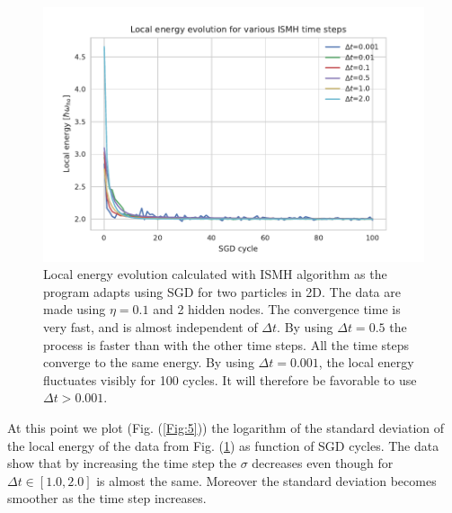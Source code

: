 \begin{figure}[ht]
\centering
\includegraphics[scale=1.0]{plot4.pdf}
\caption{Local energy evolution calculated with ISMH algorithm as the program adapts using SGD for two particles in 2D. The data are made using $\eta = 0.1$ and 2 hidden nodes. The convergence time is very fast, and is almost independent of $\Delta t$. By using $\Delta t=0.5$ the process is faster than with the other time steps. All the time steps converge to the same energy. By using $\Delta t = 0.001$, the local energy fluctuates visibly for 100 cycles. It will therefore be favorable to use $\Delta t > 0.001$.}
\label{Fig:4}
\end{figure}
At this point we plot (Fig. (\ref{Fig:5})) the logarithm of the standard deviation of the local energy of the data from Fig. (\ref{Fig:4}) as function of SGD cycles. The data show that by increasing the time step the $\sigma$ decreases even though for $\Delta t\in [1.0, 2.0]$ is almost the same. Moreover the standard deviation becomes smoother as the time step increases. 

